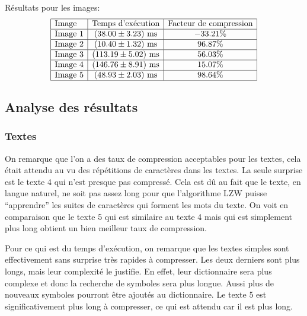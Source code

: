 \documentclass{article}[letterpaper, 11pt]
\begin{document}
Résultats pour les images:
\[
\begin{array}{|l|c|c|} \hline %
	\text{Image} & \text{Temps d'exécution} & \text{Facteur de compression}\\ \hline %
	\text{Image } 1 & (38.00  \pm 3.23) \text{ ms} & -33.21\%\\ \hline %
	\text{Image } 2 & (10.40  \pm 1.32) \text{ ms} & 96.87\%\\ \hline %
	\text{Image } 3 & (113.19 \pm 5.02) \text{ ms} & 56.03\%\\ \hline %
	\text{Image } 4 & (146.76 \pm 8.91) \text{ ms} & 15.07\%\\ \hline %
	\text{Image } 5 & (48.93  \pm 2.03) \text{ ms} & 98.64\%\\ \hline %

\end{array}
\]

\subsection{Analyse des résultats}
\subsubsection{Textes}
On remarque que l'on a des taux de compression acceptables pour les textes, cela était attendu au vu des répétitions de caractères dans les textes. La seule surprise est le texte 4 qui n'est presque pas compressé. Cela est dû au fait que le texte, en langue naturel, ne soit pas assez long pour que l'algorithme LZW puisse ``apprendre'' les suites de caractères qui forment les mots du texte. On voit en comparaison que le texte 5 qui est similaire au texte 4 mais qui est simplement plus long obtient un bien meilleur taux de compression.

Pour ce qui est du temps d'exécution, on remarque que les textes simples sont effectivement sans surprise très rapides à compresser. Les deux derniers sont plus longs, mais leur complexité le justifie. En effet, leur dictionnaire sera plus complexe et donc la recherche de symboles sera plus longue. Aussi plus de nouveaux symboles pourront être ajoutés au dictionnaire. Le texte 5 est significativement plus long à compresser, ce qui est attendu car il est plus long.
\end{document}
